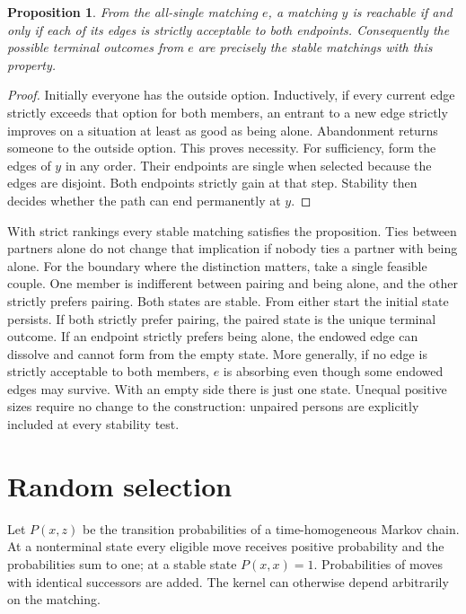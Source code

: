 \documentclass[11pt]{article}
\newtheorem{proposition}{Proposition}
\begin{document}
\begin{proposition}\label{prop:empty}
From the all-single matching \(e\), a matching \(y\) is reachable if and only if each of its edges is strictly acceptable to both endpoints. Consequently the possible terminal outcomes from \(e\) are precisely the stable matchings with this property.
\end{proposition}

\begin{proof}
Initially everyone has the outside option. Inductively, if every current edge strictly exceeds that option for both members, an entrant to a new edge strictly improves on a situation at least as good as being alone. Abandonment returns someone to the outside option. This proves necessity. For sufficiency, form the edges of \(y\) in any order. Their endpoints are single when selected because the edges are disjoint. Both endpoints strictly gain at that step. Stability then decides whether the path can end permanently at \(y\).
\end{proof}

With strict rankings every stable matching satisfies the proposition. Ties between partners alone do not change that implication if nobody ties a partner with being alone. For the boundary where the distinction matters, take a single feasible couple. One member is indifferent between pairing and being alone, and the other strictly prefers pairing. Both states are stable. From either start the initial state persists. If both strictly prefer pairing, the paired state is the unique terminal outcome. If an endpoint strictly prefers being alone, the endowed edge can dissolve and cannot form from the empty state. More generally, if no edge is strictly acceptable to both members, \(e\) is absorbing even though some endowed edges may survive. With an empty side there is just one state. Unequal positive sizes require no change to the construction: unpaired persons are explicitly included at every stability test.

\section{Random selection}\label{sec:random}

Let \(P(x,z)\) be the transition probabilities of a time-homogeneous Markov chain. At a nonterminal state every eligible move receives positive probability and the probabilities sum to one; at a stable state \(P(x,x)=1\). Probabilities of moves with identical successors are added. The kernel can otherwise depend arbitrarily on the matching.
\end{document}
